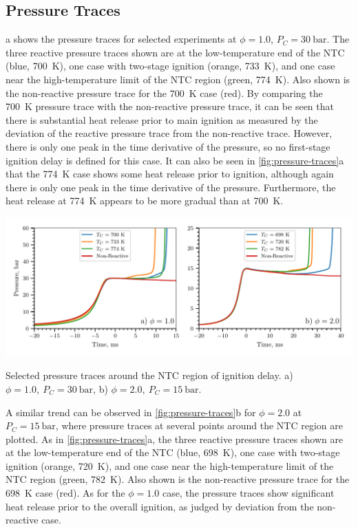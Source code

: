 \documentclass[letterpaper, review, sort&compress]{elsarticle}
\begin{document}
\subsection{Pressure Traces}\label{sec:pressure-traces}

a shows the pressure traces for selected experiments at \(\phi=1.0\),
\(P_C =\SI[number-unit-product={\ }]{30}{\bar}\). The three reactive pressure traces shown are at
the low-temperature end of the NTC (blue, \SI{700}{\K}), one case with two-stage ignition (orange,
\SI{733}{\K}), and one case near the high-temperature limit of the NTC region (green, \SI{774}{\K}).
Also shown is the non-reactive pressure trace for the \SI{700}{\K} case (red). By comparing the
\SI{700}{\K} pressure trace with the non-reactive pressure trace, it can be seen that there is
substantial heat release prior to main ignition as measured by the deviation of the reactive
pressure trace from the non-reactive trace. However, there is only one peak in the time derivative
of the pressure, so no first-stage ignition delay is defined for this case. It can also be seen in
\cref{fig:pressure-traces}a that the \SI{774}{\K} case shows some heat release prior to ignition,
although again there is only one peak in the time derivative of the pressure. Furthermore, the heat
release at \SI{774}{\K} appears to be more gradual than at \SI{700}{\K}.

\begin{center}
    \captionsetup{type=figure}
    \includegraphics[width=\textwidth]{figures/pressure-traces.pdf}
    \caption{Selected pressure traces around the NTC region of ignition delay.
    a) \(\phi=1.0,\ P_C=\SI{30}{\bar}\), b) \(\phi=2.0,\ P_C=\SI{15}{\bar}\).}
    \label{fig:pressure-traces}
\end{center}

A similar trend can be observed in \cref{fig:pressure-traces}b for \(\phi=2.0\) at
\(P_C=\SI{15}{\bar}\), where pressure traces at several points around the NTC region are plotted. As
in \cref{fig:pressure-traces}a, the three reactive pressure traces shown are at the low-temperature
end of the NTC (blue, \SI{698}{\K}), one case with two-stage ignition (orange, \SI{720}{\K}), and
one case near the high-temperature limit of the NTC region (green, \SI{782}{\K}). Also shown is the
non-reactive pressure trace for the \SI{698}{\K} case (red). As for the \(\phi=1.0\) case, the
pressure traces show significant heat release prior to the overall ignition, as judged by deviation
from the non-reactive case.
\end{document}
